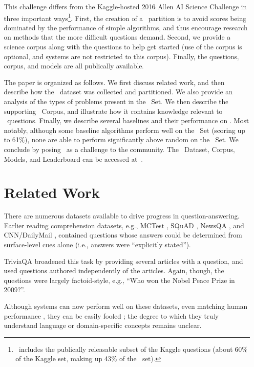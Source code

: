 This challenge differs from the Kaggle-hosted 2016 Allen AI Science Challenge \cite{schoenick2017moving} in three important ways\footnote{
\ASC~includes the publically releasable subset of the Kaggle questions (about 60\% of the Kaggle set, making up 43\% of the \ASC~set).}. First, the creation of a \Challenge~partition
is to avoid scores being dominated by the performance of simple algorithms, and thus encourage research on methods that the more difficult questions demand. Second, we provide a science corpus along with the questions to help get started (use of the corpus is optional, and systems are not restricted to this corpus). Finally, the questions, corpus, and models are all publically available.

The paper is organized as follows. We first discuss related work, and then describe how the \ASC~dataset was collected and partitioned. We also provide an analysis of the types of problems present in the \Challenge~Set. We then describe the supporting \ASC~Corpus, and illustrate how it contains knowledge relevant to \Challenge~questions. Finally, we describe several baselines and their performance on \ASC. Most notably, although some baseline algorithms perform well on the \Additional~Set (scoring up to 61\%), none are able to perform significantly above random on the \Challenge~Set. We conclude by posing \ASC~as a challenge to the community. The \ASC~Dataset, Corpus, Models, and Leaderboard can be accessed at~\ascurl.

\section{Related Work}

There are numerous datasets available to drive progress in question-answering. Earlier reading comprehension datasets, e.g., MCTest \cite{mctest}, SQuAD \cite{rajpurkar2016squad}, NewsQA \cite{trischler2016newsqa}, and CNN/DailyMail \cite{hermann2015teaching}, contained questions whose answers could be determined from surface-level cues alone (i.e., answers were ``explicitly stated'').

TriviaQA \cite{JoshiTriviaQA2017} broadened this task by providing several articles with a question, and used questions authored independently of the articles. Again, though, the questions were largely factoid-style, e.g., ``Who won the Nobel Peace Prize in 2009?''.

Although systems can now perform well on these datasets, even matching human performance \cite{human-squad}, they can be easily fooled \cite{jia2017adversarial}; the degree to which they truly understand language or domain-specific concepts remains unclear. 

